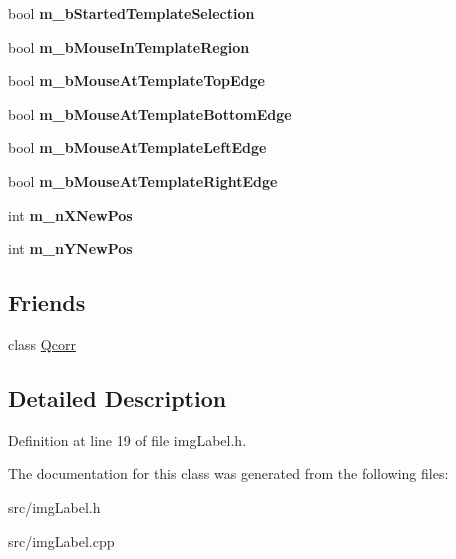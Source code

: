 \begin{DoxyCompactItemize}
\item 
\hypertarget{classImgLabel_a45fe85b4d6b6da14b556c13284624145}{
bool {\bfseries m\_\-bStartedTemplateSelection}}
\label{classImgLabel_a45fe85b4d6b6da14b556c13284624145}

\item 
\hypertarget{classImgLabel_a990abf371f11243a65aa323bfad1cf10}{
bool {\bfseries m\_\-bMouseInTemplateRegion}}
\label{classImgLabel_a990abf371f11243a65aa323bfad1cf10}

\item 
\hypertarget{classImgLabel_ad4858784cd8aa7a53f948bb42ae7b996}{
bool {\bfseries m\_\-bMouseAtTemplateTopEdge}}
\label{classImgLabel_ad4858784cd8aa7a53f948bb42ae7b996}

\item 
\hypertarget{classImgLabel_a6d005e4bb487858c70d4d14564e4a095}{
bool {\bfseries m\_\-bMouseAtTemplateBottomEdge}}
\label{classImgLabel_a6d005e4bb487858c70d4d14564e4a095}

\item 
\hypertarget{classImgLabel_a921c1163775a86236d44d84e11172177}{
bool {\bfseries m\_\-bMouseAtTemplateLeftEdge}}
\label{classImgLabel_a921c1163775a86236d44d84e11172177}

\item 
\hypertarget{classImgLabel_afa3d9dc393d218e31b71f3e34bc79f9c}{
bool {\bfseries m\_\-bMouseAtTemplateRightEdge}}
\label{classImgLabel_afa3d9dc393d218e31b71f3e34bc79f9c}

\item 
\hypertarget{classImgLabel_a8440c20742b16b7b2bdceebe3e9f3302}{
int {\bfseries m\_\-nXNewPos}}
\label{classImgLabel_a8440c20742b16b7b2bdceebe3e9f3302}

\item 
\hypertarget{classImgLabel_a2060dad81295d4e6f87328108f97d15f}{
int {\bfseries m\_\-nYNewPos}}
\label{classImgLabel_a2060dad81295d4e6f87328108f97d15f}

\end{DoxyCompactItemize}
\subsection*{Friends}
\begin{DoxyCompactItemize}
\item 
\hypertarget{classImgLabel_ae86bc9b92f374c5f78097881af49364d}{
class \hyperlink{classImgLabel_ae86bc9b92f374c5f78097881af49364d}{Qcorr}}
\label{classImgLabel_ae86bc9b92f374c5f78097881af49364d}

\end{DoxyCompactItemize}


\subsection{Detailed Description}


Definition at line 19 of file imgLabel.h.

The documentation for this class was generated from the following files:\begin{DoxyCompactItemize}
\item 
src/imgLabel.h\item 
src/imgLabel.cpp\end{DoxyCompactItemize}
